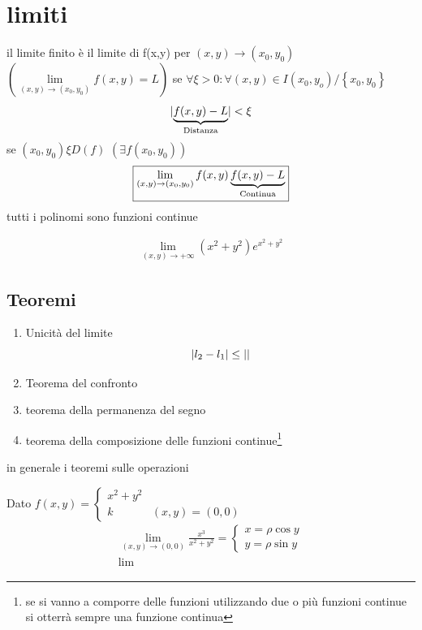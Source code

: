 \section{limiti}
\begin{defi}
	il limite finito è il limite di f(x,y) per $(x,y)\to (x_0,y_0)$ $(\lim\limits_{(x,y)\to(x_0,y_0)} f(x,y)=L)$ se $\forall\xi >0: \forall (x,y)\in I(x_0,y_o)/\left\{x_0,y_0\right\}$
	\begin{equation*}
		\abs{\underbrace{f(x,y)-L}_{\text{\shortstack{Distanza}}}}<\xi
	\end{equation*}
	se $(x_0,y_0)\xi D(f)$ $(\exists f(x_0,y_0))$
	\begin{equation*}
		\boxed{\lim_{(x,y)\to (x_0,y_0)} f(x,y)\underbrace{f(x,y)-L}_{\text{\shortstack{Continua}}}}
	\end{equation*}
tutti i polinomi sono funzioni continue	
\end{defi}
\begin{esempio}
	\begin{equation*}
		\begin{matrix}
			\lim_{(x,y)\to +\infty}(x^2+y^2)e^{x^2+y^2}
		\end{matrix}
	\end{equation*}
\end{esempio}
\subsection{Teoremi}
\begin{enumerate}
	\item Unicità del limite
	\begin{equation*}
		\lvert l_2-l_1\rvert\leq \lvert\rvert
	\end{equation*}
	\item Teorema del confronto
	\item teorema della permanenza del segno
	\item teorema della composizione delle funzioni continue\footnote{se si vanno a comporre delle funzioni utilizzando due o più funzioni continue si otterrà sempre una funzione continua}
\end{enumerate}
in generale i teoremi sulle operazioni
\begin{esempio}
	Dato $f(x,y)=\begin{cases} x^2+y^2\\ k&(x,y)=(0,0)\end{cases}$
	\begin{equation*}
		\begin{matrix}
			\lim_{(x,y)\to(0,0)}\frac{x^3}{x^2+y^2}=\begin{cases}
				x=\rho \cos y\\
				y=\rho \sin y
			\end{cases}\\
			\lim_{}
		\end{matrix}
	\end{equation*}
	
	
\end{esempio}
